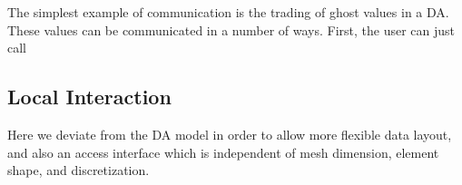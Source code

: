     The simplest example of communication is the trading of ghost values in a DA. These values can be communicated in a
number of ways. First, the user can just call
\begin{quote}
\end{quote}


\subsection{Local Interaction}

    Here we deviate from the DA model in order to allow more flexible data layout, and also an access interface which is
independent of mesh dimension, element shape, and discretization.

